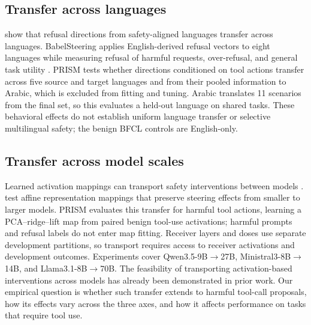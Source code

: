 \subsection{Transfer across languages}
\citet{wang2025refusaluniversal} show that refusal directions from
safety-aligned languages transfer across languages. BabelSteering applies English-derived refusal vectors to eight languages while measuring refusal of harmful requests, over-refusal, and general task utility \citep{stein2026babel}. PRISM tests whether directions conditioned on tool actions transfer across five source and target languages and from their pooled information to Arabic, which is excluded from fitting and tuning. Arabic translates 11 scenarios from the final set, so this evaluates a held-out language on shared tasks. These behavioral effects do not establish uniform language transfer or selective multilingual safety; the benign BFCL controls are English-only.

\subsection{Transfer across model scales}
Learned activation mappings can transport safety interventions between models \citep{oozeer2025activation}. \citet{bello2025linear} test affine representation mappings that preserve steering effects from smaller to larger models. PRISM evaluates this transfer for harmful tool actions, learning a PCA--ridge--lift map from paired benign tool-use activations; harmful prompts and refusal labels do not enter map fitting. Receiver layers and doses use separate development partitions, so transport requires access to receiver activations and development outcomes. Experiments cover Qwen3.5-9B$\rightarrow$27B, Ministral3-8B$\rightarrow$14B, and Llama3.1-8B$\rightarrow$70B. The feasibility of transporting activation-based interventions across models has already been demonstrated in prior work. Our empirical question is whether such transfer extends to harmful tool-call proposals, how its effects vary across the three axes, and how it affects performance on tasks that require tool use.